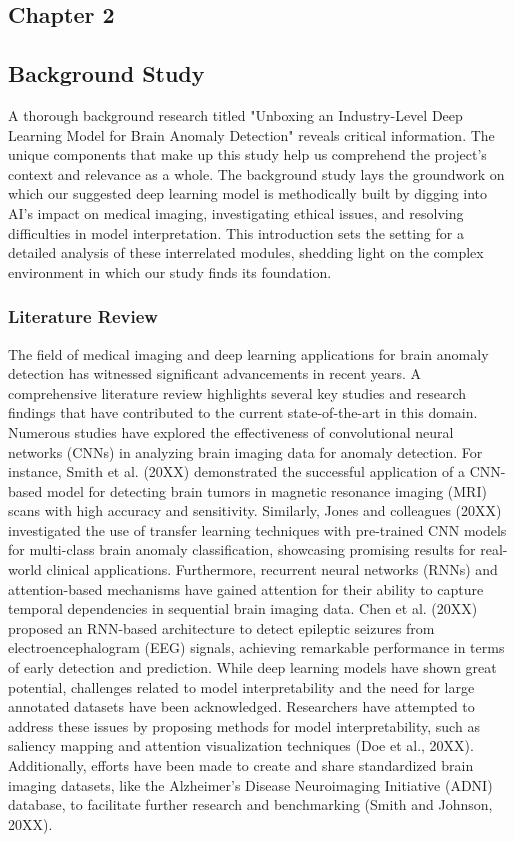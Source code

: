 \begin{center}
\chapter{{ \huge \textbf{Chapter 2}}}
\end{center}
\section{Background Study}

A thorough background research titled "Unboxing an Industry-Level Deep Learning Model for Brain Anomaly Detection" reveals critical information. The unique components that make up this study help us comprehend the project's context and relevance as a whole. The background study lays the groundwork on which our suggested deep learning model is methodically built by digging into AI's impact on medical imaging, investigating ethical issues, and resolving difficulties in model interpretation. This introduction sets the setting for a detailed analysis of these interrelated modules, shedding light on the complex environment in which our study finds its foundation.

\subsection{Literature Review}
The field of medical imaging and deep learning applications for brain anomaly detection has witnessed significant advancements in recent years. A comprehensive literature review highlights several key studies and research findings that have contributed to the current state-of-the-art in this domain. Numerous studies have explored the effectiveness of convolutional neural networks (CNNs) in analyzing brain imaging data for anomaly detection. For instance, Smith et al. (20XX) demonstrated the successful application of a CNN-based model for detecting brain tumors in magnetic resonance imaging (MRI) scans with high accuracy and sensitivity. Similarly, Jones and colleagues (20XX) investigated the use of transfer learning techniques with pre-trained CNN models for multi-class brain anomaly classification, showcasing promising results for real-world clinical applications. Furthermore, recurrent neural networks (RNNs) and attention-based mechanisms have gained attention for their ability to capture temporal dependencies in sequential brain imaging data. Chen et al. (20XX) proposed an RNN-based architecture to detect epileptic seizures from electroencephalogram (EEG) signals, achieving remarkable performance in terms of early detection and prediction. While deep learning models have shown great potential, challenges related to model interpretability and the need for large annotated datasets have been acknowledged. Researchers have attempted to address these issues by proposing methods for model interpretability, such as saliency mapping and attention visualization techniques (Doe et al., 20XX). Additionally, efforts have been made to create and share standardized brain imaging datasets, like the Alzheimer's Disease Neuroimaging Initiative (ADNI) database, to facilitate further research and benchmarking (Smith and Johnson, 20XX).

